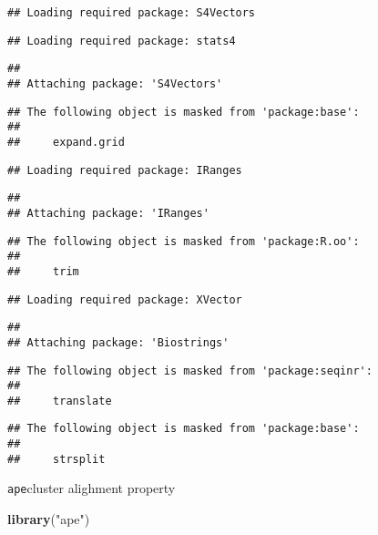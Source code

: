 \documentclass[]{article}
\newenvironment{Shaded}{\begin{snugshade}}{\end{snugshade}}
\newcommand{\KeywordTok}[1]{\textcolor[rgb]{0.13,0.29,0.53}{\textbf{#1}}}
\newcommand{\NormalTok}[1]{#1}
\newcommand{\StringTok}[1]{\textcolor[rgb]{0.31,0.60,0.02}{#1}}
\begin{document}
\begin{verbatim}
## Loading required package: S4Vectors
\end{verbatim}

\begin{verbatim}
## Loading required package: stats4
\end{verbatim}

\begin{verbatim}
## 
## Attaching package: 'S4Vectors'
\end{verbatim}

\begin{verbatim}
## The following object is masked from 'package:base':
## 
##     expand.grid
\end{verbatim}

\begin{verbatim}
## Loading required package: IRanges
\end{verbatim}

\begin{verbatim}
## 
## Attaching package: 'IRanges'
\end{verbatim}

\begin{verbatim}
## The following object is masked from 'package:R.oo':
## 
##     trim
\end{verbatim}

\begin{verbatim}
## Loading required package: XVector
\end{verbatim}

\begin{verbatim}
## 
## Attaching package: 'Biostrings'
\end{verbatim}

\begin{verbatim}
## The following object is masked from 'package:seqinr':
## 
##     translate
\end{verbatim}

\begin{verbatim}
## The following object is masked from 'package:base':
## 
##     strsplit
\end{verbatim}

\texttt{ape}cluster alighment property

\begin{Shaded}
\begin{Highlighting}[]
\KeywordTok{library}\NormalTok{(}\StringTok{"ape"}\NormalTok{)}
\end{Highlighting}
\end{Shaded}
\end{document}
